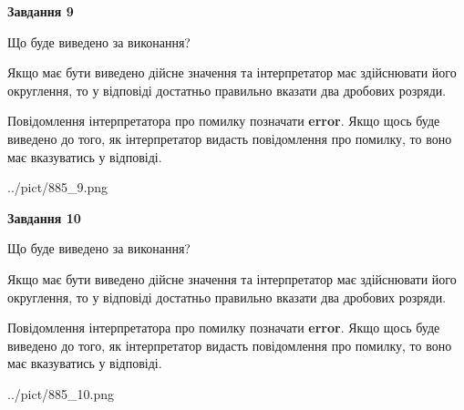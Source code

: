 \documentclass[12pt, ukrainian]{article}
\begin{document}
{\begin {Large}
{\begin {center}\textbf{Завдання 9}\end {center}}\par
Що буде виведено за виконання? \par

Якщо має бути виведено дійсне значення та інтерпретатор має здійснювати його округлення, 
то у відповіді достатньо правильно вказати два дробових розряди.

Повідомлення інтерпретатора про помилку позначати \textbf{error}.
Якщо щось буде виведено до того, як інтерпретатор видасть повідомлення про помилку, 
то воно має вказуватись у відповіді. \par

\begin{center}
	{../pict/885_9.png}
\end{center}
\newpage

{\begin {center}\textbf{Завдання 10}\end {center}}\par
Що буде виведено за виконання? \par

Якщо має бути виведено дійсне значення та інтерпретатор має здійснювати його округлення, 
то у відповіді достатньо правильно вказати два дробових розряди.

Повідомлення інтерпретатора про помилку позначати \textbf{error}.
Якщо щось буде виведено до того, як інтерпретатор видасть повідомлення про помилку, 
то воно має вказуватись у відповіді. \par

\begin{center}
	{../pict/885_10.png}
\end{center}
\newpage

\end {Large}}
\end{document}
